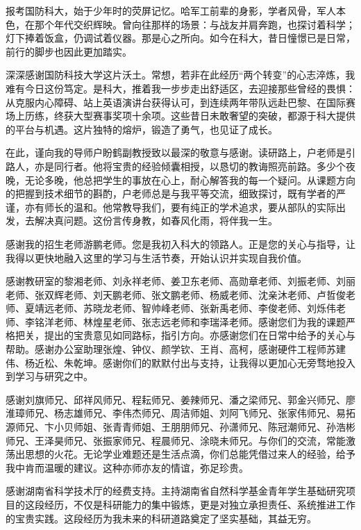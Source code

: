 

\begin{ack}
报考国防科大，始于少年时的荧屏记忆。哈军工前辈的身影，学者风骨，军人本色，在那个年代交织辉映。曾向往那样的场景：与战友并肩奔跑，也探讨着科学；灯下捧着饭盒，仍调试着仪器。那是心之所向。如今在科大，昔日憧憬已是日常，前行的脚步也因此更加踏实。

深深感谢国防科技大学这片沃土。常想，若非在此经历“两个转变”的心志淬炼，我难有今日这份笃定。是科大，推着我一步步走出舒适区，去迎接那些曾经的畏惧：从克服内心障碍、站上英语演讲台获得认可，到连续两年带队远赴巴黎、在国际赛场上历练，终获大型赛事奖项十余项。这些昔日未敢奢望的突破，都源于科大提供的平台与机遇。这片独特的熔炉，锻造了勇气，也见证了成长。

在此，谨向我的导师户盼鹤副教授致以最深的敬意与感谢。读研路上，户老师是引路人，亦是同行者。他将宝贵的经验倾囊相授，以恳切的教诲照亮前路。多少个夜晚，无论多晚，他总把学生的事放在心上，耐心解答我的每一个疑问。从课题方向的把握到技术细节的斟酌，户老师总是与我平等交流，细致探讨，既有学者的严谨，亦有师长的温和。他常教导我们，要有纯正的学术追求，要从部队的实际出发，去解决真问题。这份言传身教，如春风化雨，将伴我一生。

感谢我的招生老师游鹏老师。您是我初入科大的领路人。正是您的关心与指导，让我得以更快地融入这里的学习与生活节奏，开始认识并实现自我价值。

感谢教研室的黎湘老师、刘永祥老师、姜卫东老师、高勋章老师、刘振老师、刘丽老师、张双辉老师、刘天鹏老师、张文鹏老师、杨威老师、沈亲沐老师、卢哲俊老师、夏靖远老师、苏晓龙老师、智帅峰老师、张新禹老师、李俊老师、刘烁伟老师、李铭洋老师、林煌星老师、张志远老师和李瑞泽老师。感谢您们为我的课题严格把关，提出的宝贵意见如同路标，指引方向。亦感谢您们在日常中给予的关心与帮助。感谢办公室助理张煌、钟仪、颜学钦、王肖、高柯，感谢硬件工程师苏建伟、杨近松、朱乾坤。感谢你们的默默付出与支持，让我得以更加心无旁骛地投入到学习与研究之中。

感谢刘旗师兄、邱祥风师兄、程耘师兄、姜辣师兄、潘之梁师兄、郭金兴师兄、廖淮璋师兄、杨志雄师兄、李伟杰师兄、周洁师姐、刘阿飞师兄、张家伟师兄、易拓源师兄、卞小贝师姐、张青青师姐、王朋朋师兄、孙潇师兄、陈冠潮师兄、孙浩彬师兄、王泽昊师兄、张振家师兄、程晨师兄、涂晓未师兄。与你们的交流，常能激荡出思想的火花。无论学业难题还是生活点滴，你们总能凭借过来人的经验，给予我中肯而温暖的建议。这种亦师亦友的情谊，弥足珍贵。

感谢湖南省科学技术厅的经费支持。主持湖南省自然科学基金青年学生基础研究项目的这段经历，不仅是科研能力的集中锻炼，更是对独立承担责任、系统推进工作的宝贵实践。这段经历为我未来的科研道路奠定了坚实基础，其益无穷。


\end{ack}

